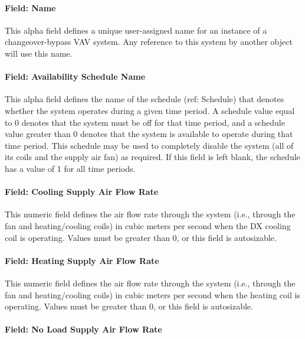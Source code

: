 \paragraph{Field: Name}\label{field-name-9-020}

This alpha field defines a unique user-assigned name for an instance of a changeover-bypass VAV system. Any reference to this system by another object will use this name.

\paragraph{Field: Availability Schedule Name}\label{field-availability-schedule-name-8-004}

This alpha field defines the name of the schedule (ref: Schedule) that denotes whether the system operates during a given time period. A schedule value equal to 0 denotes that the system must be off for that time period, and a schedule value greater than 0 denotes that the system is available to operate during that time period. This schedule may be used to completely disable the system (all of its coils and the supply air fan) as required. If this field is left blank, the schedule has a value of 1 for all time periods.

\paragraph{Field: Cooling Supply Air Flow Rate}\label{field-cooling-supply-air-flow-rate-4-000}

This numeric field defines the air flow rate through the system (i.e., through the fan and heating/cooling coils) in cubic meters per second when the DX cooling coil is operating. Values must be greater than 0, or this field is autosizable.

\paragraph{Field: Heating Supply Air Flow Rate}\label{field-heating-supply-air-flow-rate-6}

This numeric field defines the air flow rate through the system (i.e., through the fan and heating/cooling coils) in cubic meters per second when the heating coil is operating. Values must be greater than 0, or this field is autosizable.

\paragraph{Field: No Load Supply Air Flow Rate}\label{field-no-load-supply-air-flow-rate-5}

